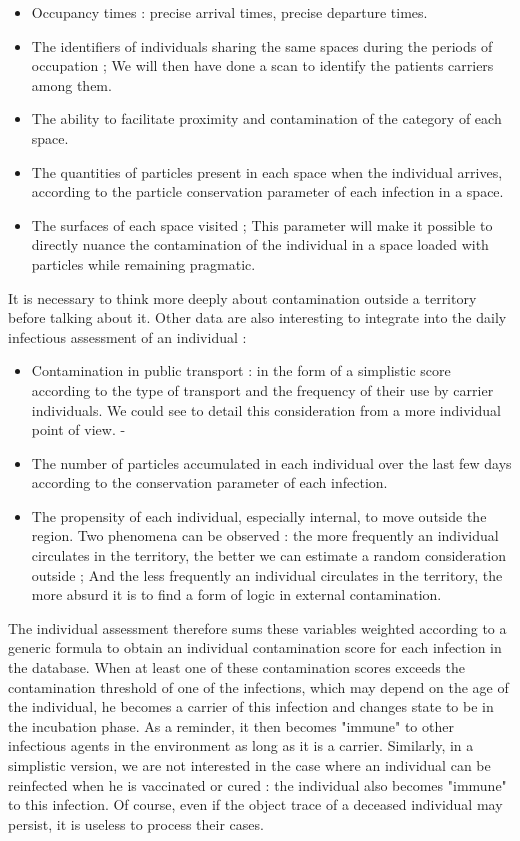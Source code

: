 \begin{itemize}
\item Occupancy times : precise arrival times, precise departure times.
\item The identifiers of individuals sharing the same spaces during the periods of occupation ; We will then have done a scan to identify the patients carriers among them.
\item The ability to facilitate proximity and contamination of the category of each space.
\item The quantities of particles present in each space when the individual arrives, according to the particle conservation parameter of each infection in a space.
\item The surfaces of each space visited ; This parameter will make it possible to directly nuance the contamination of the individual in a space loaded with particles while remaining pragmatic.\\
\end{itemize}

It is necessary to think more deeply about contamination outside a territory before talking about it. Other data are also interesting to integrate into the daily infectious assessment of an individual :\\

\begin{itemize}
\item Contamination in public transport : in the form of a simplistic score according to the type of transport and the frequency of their use by carrier individuals. We could see to detail this consideration from a more individual point of view.
-\item The number of particles accumulated in each individual over the last few days according to the conservation parameter of each infection.
\item The propensity of each individual, especially internal, to move outside the region. Two phenomena can be observed : the more frequently an individual circulates in the territory, the better we can estimate a random consideration outside ; And the less frequently an individual circulates in the territory, the more absurd it is to find a form of logic in external contamination.\\
\end{itemize}

The individual assessment therefore sums these variables weighted according to a generic formula to obtain an individual contamination score for each infection in the database. When at least one of these contamination scores exceeds the contamination threshold of one of the infections, which may depend on the age of the individual, he becomes a carrier of this infection and changes state to be in the incubation phase. As a reminder, it then becomes "immune" to other infectious agents in the environment as long as it is a carrier. Similarly, in a simplistic version, we are not interested in the case where an individual can be reinfected when he is vaccinated or cured : the individual also becomes "immune" to this infection. Of course, even if the object trace of a deceased individual may persist, it is useless to process their cases.\\

